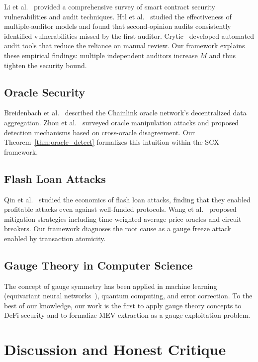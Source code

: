 \documentclass[12pt,a4paper]{article}
\theoremstyle{remark}
\begin{document}
Li et al.~\cite{li2020survey} provided a comprehensive survey of smart contract
security vulnerabilities and audit techniques. Htl et al.~\cite{htl2023audit}
studied the effectiveness of multiple-auditor models and found that
second-opinion audits consistently identified vulnerabilities missed by the
first auditor. Crytic~\cite{crytic2023} developed automated audit tools that
reduce the reliance on manual review. Our framework explains these empirical
findings: multiple independent auditors increase $M$ and thus tighten the
security bound.

\subsection{Oracle Security}

Breidenbach et al.~\cite{chainlink2021} described the Chainlink oracle
network's decentralized data aggregation. Zhou et al.~\cite{zhou2023oracle}
surveyed oracle manipulation attacks and proposed detection mechanisms based
on cross-oracle disagreement. Our Theorem~\ref{thm:oracle_detect} formalizes
this intuition within the SCX framework.

\subsection{Flash Loan Attacks}

Qin et al.~\cite{qin2021attracting} studied the economics of flash loan
attacks, finding that they enabled profitable attacks even against well-funded
protocols. Wang et al.~\cite{wang2022flashloan} proposed mitigation strategies
including time-weighted average price oracles and circuit breakers. Our
framework diagnoses the root cause as a gauge freeze attack enabled by
transaction atomicity.

\subsection{Gauge Theory in Computer Science}

The concept of gauge symmetry has been applied in machine learning (equivariant
neural networks~\cite{cohen2019gauge}), quantum computing, and error
correction. To the best of our knowledge, our work is the first to apply gauge
theory concepts to DeFi security and to formalize MEV extraction as a gauge
exploitation problem.

\section{Discussion and Honest Critique}
\label{sec:critique}
\end{document}
